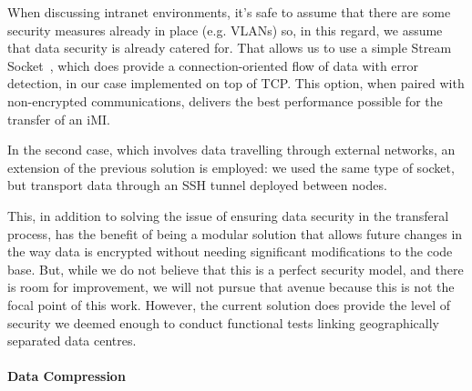 When discussing intranet environments, it’s safe to assume that there are some security measures already in place (e.g. VLANs) so, in this regard, we assume that data security is already catered for. That allows us to use a simple Stream Socket~\cite{py_socks}, which does provide a connection-oriented flow of data with error detection, in our case implemented on top of TCP. This option, when paired with non-encrypted communications, delivers the best performance possible for the transfer of an iMI.

In the second case, which involves data travelling through external networks, an extension of the previous solution is employed: we used the same type of socket, but transport data through an SSH tunnel deployed between nodes.

This, in addition to solving the issue of ensuring data security in the transferal process, has the benefit of being a modular solution that allows future changes in the way data is encrypted without needing significant modifications to the code base. But, while we do not believe that this is a perfect security model, and there is room for improvement, we will not pursue that avenue because this is not the focal point of this work. However, the current solution does provide the level of security we deemed enough to conduct functional tests linking geographically separated data centres.

\paragraph{Data Compression}
\label{par:impl_data_compression}




